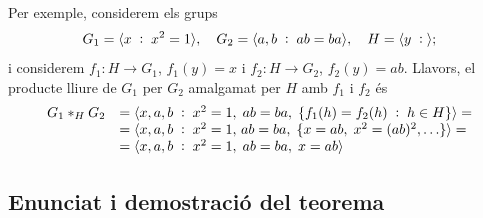 \documentclass[../main.tex]{subfiles}
\begin{document}
\begin{ej}
\label{ej:productelliureamalgamatwikidots} Per exemple, considerem els grups
\begin{equation}
    \notag
    G_1 = \langle x\;:\;x^2=1\rangle,\quad G_2 = \langle a,b\;:\;ab=ba\rangle,\quad H=\langle y\;:\;\rangle;
\end{equation}
i considerem $f_1:H\rightarrow G_1$, $f_1(y) = x$ i $f_2:H\rightarrow G_2$, $f_2(y) = ab$. Llavors, el producte lliure de $G_1$ per $G_2$ amalgamat per $H$ amb $f_1$ i $f_2$ és
\begin{equation}
    \notag
    \begin{array}{ll}
        G_1*_H G_2 & = \langle x,a,b\;:\;x^2=1,\;ab=ba,\;\{f_1(h)=f_2(h)\;:\;h\in H\}\rangle =  \\
         & = \langle x,a,b\;:\;x^2=1,\,ab=ba,\;\{x=ab,\;x^2=(ab)^2,\ldots\}\rangle = \\
          & = \langle x,a,b\;:\;x^2=1,\;ab=ba,\;x=ab\rangle
    \end{array}
\end{equation}
\end{ej}


\subsection{Enunciat i demostració del teorema}
\end{document}
